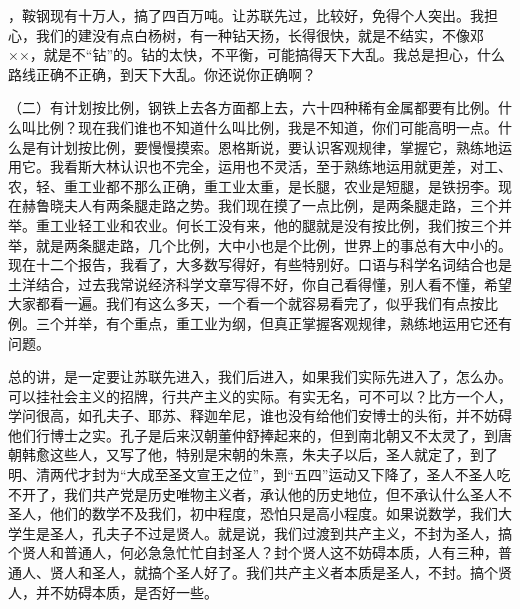 ，鞍钢现有十万人，搞了四百万吨。让苏联先过，比较好，免得个人突出。我担心，我们的建没有点白杨树，有一种钻天扬，长得很快，就是不结实，不像邓××，就是不“钻”的。钻的太快，不平衡，可能搞得天下大乱。我总是担心，什么路线正确不正确，到天下大乱。你还说你正确啊？

（二）有计划按比例，钢铁上去各方面都上去，六十四种稀有金属都要有比例。什么叫比例？现在我们谁也不知道什么叫比例，我是不知道，你们可能高明一点。什么是有计划按比例，要慢慢摸索。恩格斯说，要认识客观规律，掌握它，熟练地运用它。我看斯大林认识也不完全，运用也不灵活，至于熟练地运用就更差，对工、农，轻、重工业都不那么正确，重工业太重，是长腿，农业是短腿，是铁拐李。现在赫鲁晓夫人有两条腿走路之势。我们现在摸了一点比例，是两条腿走路，三个并举。重工业轻工业和农业。何长工没有来，他的腿就是没有按比例，我们按三个并举，就是两条腿走路，几个比例，大中小也是个比例，世界上的事总有大中小的。现在十二个报告，我看了，大多数写得好，有些特别好。口语与科学名词结合也是土洋结合，过去我常说经济科学文章写得不好，你自己看得懂，别人看不懂，希望大家都看一遍。我们有这么多天，一个看一个就容易看完了，似乎我们有点按比例。三个并举，有个重点，重工业为纲，但真正掌握客观规律，熟练地运用它还有问题。

总的讲，是一定要让苏联先进入，我们后进入，如果我们实际先进入了，怎么办。可以挂社会主义的招牌，行共产主义的实际。有实无名，可不可以？比方一个人，学问很高，如孔夫子、耶苏、释迦牟尼，谁也没有给他们安博士的头衔，并不妨碍他们行博士之实。孔子是后来汉朝董仲舒捧起来的，但到南北朝又不太灵了，到唐朝韩愈这些人，又写了他，特别是宋朝的朱熹，朱夫子以后，圣人就定了，到了明、清两代才封为“大成至圣文宣王之位”，到“五四”运动又下降了，圣人不圣人吃不开了，我们共产党是历史唯物主义者，承认他的历史地位，但不承认什么圣人不圣人，他们的数学不及我们，初中程度，恐怕只是高小程度。如果说数学，我们大学生是圣人，孔夫子不过是贤人。就是说，我们过渡到共产主义，不封为圣人，搞个贤人和普通人，何必急急忙忙自封圣人？封个贤人这不妨碍本质，人有三种，普通人、贤人和圣人，就搞个圣人好了。我们共产主义者本质是圣人，不封。搞个贤人，并不妨碍本质，是否好一些。

